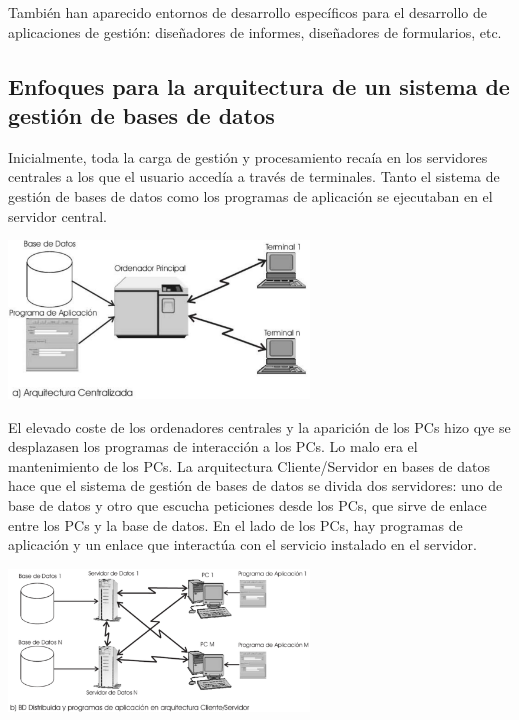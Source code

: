 \documentclass[10pt,a4paper,spanish]{report}
\begin{document}
También han aparecido entornos de desarrollo específicos para el desarrollo de aplicaciones de gestión: diseñadores de informes, diseñadores de formularios, etc.

\newpage
\textcolor[rgb]{1,0.2,0.3}{\section{Enfoques para la arquitectura de un sistema de gestión de bases de datos}}
Inicialmente, toda la carga de gestión y procesamiento recaía en los servidores centrales a los que el usuario accedía a través de terminales. Tanto el sistema de gestión de bases de datos como los programas de aplicación se ejecutaban en el servidor central. 

\begin{center}
\includegraphics[width=0.6\textwidth]{acentralizada}
\end{center}

El elevado coste de los ordenadores centrales y la aparición de los PCs hizo qye se desplazasen los programas de interacción a los PCs. Lo malo era el mantenimiento de los PCs. La arquitectura Cliente/Servidor en bases de datos hace que el sistema de gestión de bases de datos se divida dos servidores: uno de base de datos y otro que escucha peticiones desde los PCs, que sirve de enlace entre los PCs y la base de datos. En el lado de los PCs, hay programas de aplicación y un enlace que interactúa con el servicio instalado en el servidor.

\begin{center}
\includegraphics[width=0.6\textwidth]{acs}
\end{center}
\end{document}
